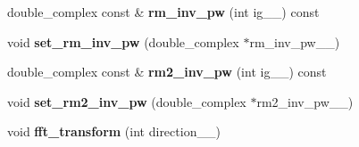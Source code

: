 \begin{DoxyCompactItemize}
\item 
\hypertarget{classsirius_1_1_potential_a88797e14b5485d569ca62a9b7df70208}{}double\+\_\+complex const \& {\bfseries rm\+\_\+inv\+\_\+pw} (int ig\+\_\+\+\_\+) const \label{classsirius_1_1_potential_a88797e14b5485d569ca62a9b7df70208}

\item 
\hypertarget{classsirius_1_1_potential_aa1757190f305d595265737af57fd66f5}{}void {\bfseries set\+\_\+rm\+\_\+inv\+\_\+pw} (double\+\_\+complex $\ast$rm\+\_\+inv\+\_\+pw\+\_\+\+\_\+)\label{classsirius_1_1_potential_aa1757190f305d595265737af57fd66f5}

\item 
\hypertarget{classsirius_1_1_potential_a1b67ac853bafec92e0aa5de2201431fe}{}double\+\_\+complex const \& {\bfseries rm2\+\_\+inv\+\_\+pw} (int ig\+\_\+\+\_\+) const \label{classsirius_1_1_potential_a1b67ac853bafec92e0aa5de2201431fe}

\item 
\hypertarget{classsirius_1_1_potential_a05a695c7951b7b6fdb04e9af5bcb5b31}{}void {\bfseries set\+\_\+rm2\+\_\+inv\+\_\+pw} (double\+\_\+complex $\ast$rm2\+\_\+inv\+\_\+pw\+\_\+\+\_\+)\label{classsirius_1_1_potential_a05a695c7951b7b6fdb04e9af5bcb5b31}

\item 
\hypertarget{classsirius_1_1_potential_af3d19f763090fa0ee612e35d3e1dabe2}{}void {\bfseries fft\+\_\+transform} (int direction\+\_\+\+\_\+)\label{classsirius_1_1_potential_af3d19f763090fa0ee612e35d3e1dabe2}

\end{DoxyCompactItemize}
